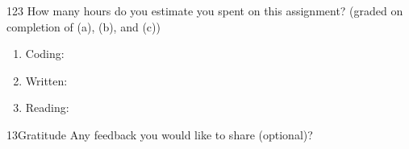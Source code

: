 \documentclass[11pt]{article}
\begin{document}
\begin{studentanswer}[30]
\end{studentanswer}



\newpage
\begin{problem}{12}{3}
How many hours do you estimate you spent on this assignment? (graded on completion of (a), (b), and (c))
\begin{enumerate}[label=(\alph*)]
    \item Coding: \\
    \item Written: \\
    \item Reading: \\
\end{enumerate}
\end{problem}

\begin{studentanswer}[6]
\end{studentanswer}



\begin{problem}{13}{Gratitude}
Any feedback you would like to share (optional)?
\end{problem}

\begin{studentanswer}[4]

\end{studentanswer}
\end{document}
